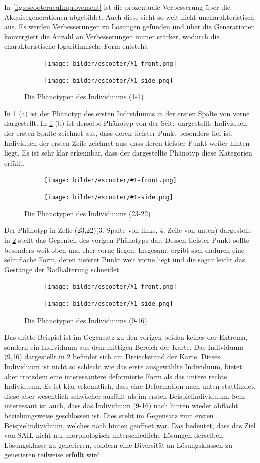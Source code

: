 In \cref{fig:escooteracqImprovement} ist die prozentuale Verbesserung über die Akquisegenerationen abgebildet.
Auch diese sieht so weit nicht uncharakteristisch aus.
Es werden Verbesserungen zu Lösungen gefunden und über die Generationen konvergiert die Anzahl an Verbesserungen immer stärker, wodurch die charakteristische logarithmische Form entsteht.

\newcommand{\escooterpheno}[1]{
\begin{figure}[h]
	\centering
	\begin{subfigure}[t]{0.5\textwidth}
		\centering
		\texttt{[image: bilder/escooter/\#1-front.png]}
		\subcaption{vorne}
	\end{subfigure}\hfill
	\begin{subfigure}[t]{0.5\textwidth}
		\centering
		\texttt{[image: bilder/escooter/\#1-side.png]}
		\subcaption{Seite}
	\end{subfigure}
\caption{Die Phänotypen des Individuums (#1)}
\label{fig:escooterpheno#1}
\end{figure}
}

\newcommand{\escref}[1]{
	\cref{fig:escooterpheno#1}
}

\escooterpheno{1-1}

In \escref{1-1} (a) ist der Phänotyp des ersten Individuums in der ersten Spalte von vorne dargestellt.
In \escref{1-1} (b) ist derselbe Phänotyp von der Seite dargestellt.
Individuen der ersten Spalte zeichnet aus, dass deren tiefster Punkt besonders tief ist.
Individuen der ersten Zeile zeichnet aus, dass deren tiefster Punkt weiter hinten liegt.
Es ist sehr klar erkennbar, dass der dargestellte Phänotyp diese Kategorien erfüllt.


\escooterpheno{23-22}

Der Phänotyp in Zelle (23,22)(3. Spalte von links, 4. Zeile von unten) dargestellt in \escref{23-22} stellt das Gegenteil des vorigen Phänotyps dar.
Dessen tiefster Punkt sollte besonders weit oben und eher vorne liegen.
Insgesamt ergibt sich dadurch eine sehr flache Form, deren tiefster Punkt weit vorne liegt und die sogar leicht das Gestänge der Radhalterung schneidet.

\escooterpheno{9-16}

Das dritte Beispiel ist im Gegensatz zu den vorigen beiden keines der Extrema, sondern ein Individuum aus dem mittigen Bereich der Karte.
Das Individuum (9,16) dargestellt in \escref{23-22} befindet sich am Dreiecksrand der Karte.
Dieses Individuum ist nicht so schlecht wie das erste ausgewählte Individuum, bietet aber trotzdem eine interessantere deformierte Form als das untere rechte Individuum.
Es ist klar erkenntlich, dass eine Deformation nach unten stattfindet, diese aber wesentlich schwächer ausfällt als im ersten Beispielindividuum.
Sehr interessant ist auch, dass das Individuum (9-16) nach hinten wieder abflacht beziehungsweise geschlossen ist.
Dies steht im Gegensatz zum ersten Beispielindividuum, welches nach hinten geöffnet war.
Das bedeutet, dass das Ziel von SAIL nicht nur morphologisch unterschiedliche Lösungen derselben Lösungsklasse zu generieren, sondern eine Diversität an Lösungsklassen zu generieren teilweise erfüllt wird.

